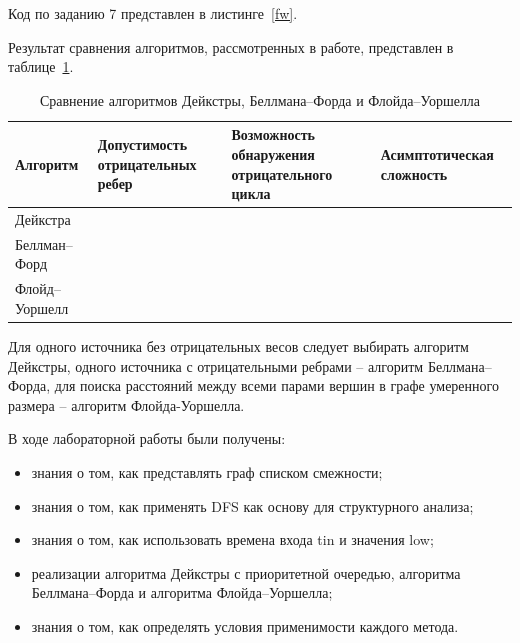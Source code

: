 
Код по заданию 7 представлен в листинге~\ref{fw}.



Результат сравнения алгоритмов, рассмотренных в работе, представлен в таблице~\ref{compare}.

\begin{table}[!htbp]
	\caption{Сравнение алгоритмов Дейкстры, Беллмана–Форда и Флойда–Уоршелла}
	\label{compare}
	\begin{tabularx}{\textwidth}{|p{3.5cm}|X|X|p{4cm}|}
		\hline
		\textbf{Алгоритм} & \textbf{Допустимость отрицательных ребер} & \textbf{Возможность обнаружения отрицательного цикла} & \textbf{Асимптотическая сложность} \\\hline
		Дейкстра      &  &  &  \\\hline
		Беллман–Форд  &  &  &  \\\hline
		Флойд–Уоршелл &  &  &  \\\hline
	\end{tabularx}
\end{table}
\FloatBarrier

Для одного источника без отрицательных весов следует выбирать алгоритм Дейкстры, 
одного источника с отрицательными ребрами -- алгоритм Беллмана–Форда, 
для поиска расстояний между всеми парами вершин в графе умеренного размера -- алгоритм Флойда-Уоршелла.


В ходе лабораторной работы были получены:
\begin{itemize}
	\item знания о том, как представлять граф списком смежности;
	\item знания о том, как применять DFS как основу для структурного анализа;
	\item знания о том, как использовать времена входа tin и значения low;
	\item реализации алгоритма Дейкстры с приоритетной очередью, алгоритма Беллмана–Форда и алгоритма Флойда–Уоршелла;
	\item знания о том, как определять условия применимости каждого метода.
\end{itemize}


